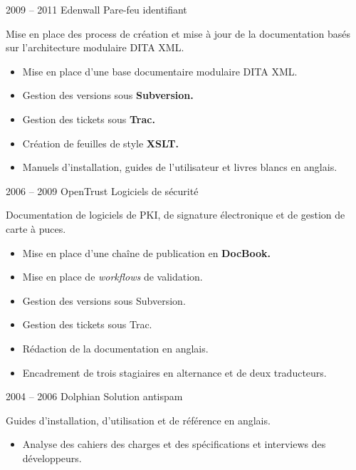 \documentclass[12pt,a4paper,roman]{moderncv}
\begin{document}
\cventry
    {2009 – 2011}
    {Edenwall}
    {Pare-feu identifiant}
    {}
    {}
    {Mise en place des process de création et mise à jour de la documentation
      basés sur l'architecture modulaire DITA XML.
      \begin{itemize}
      \item Mise en place d'une base documentaire modulaire DITA XML.
      \item Gestion des versions sous \textbf{Subversion.}
      \item Gestion des tickets sous \textbf{Trac.}
      \item Création de feuilles de style \textbf{XSLT.}
      \item Manuels d'installation, guides de l'utilisateur et livres blancs en
        anglais.
    \end{itemize}}


\cventry
    {2006 – 2009}
    {OpenTrust}
    {Logiciels de sécurité}
    {}
    {}
    {Documentation de logiciels de PKI, de signature électronique et
      de gestion de carte à puces.
      \begin{itemize}
      \item Mise en place d'une chaîne de publication en \textbf{DocBook.}
      \item Mise en place de \textit{workflows} de validation.
      \item Gestion des versions sous Subversion.
      \item Gestion des tickets sous Trac.
      \item Rédaction de la documentation en anglais.
      \item Encadrement de trois stagiaires en alternance et de deux
        traducteurs.
    \end{itemize}}


\cventry
    {2004 – 2006}
    {Dolphian}
    {Solution antispam}
    {}
    {}
    {Guides d'installation, d'utilisation et de référence en anglais.
      \begin{itemize}
      \item Analyse des cahiers des charges et des spécifications et interviews
        des développeurs.
    \end{itemize}}

\end{document}

